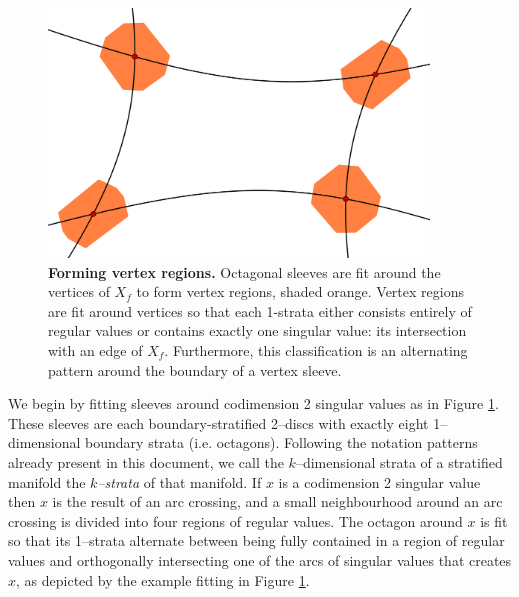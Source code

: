 \begin{figure}[h!]
	\centering
	\includegraphics[width=0.9\textwidth]{figures/vertex-sleeve.png}
	\caption{
		\textbf{Forming vertex regions.}
		Octagonal sleeves are fit around the vertices of $X_f$ to form vertex regions, shaded orange.
		Vertex regions are fit around vertices so that each 1-strata either consists entirely of regular values or contains exactly one singular value: its intersection with an edge of $X_f$.
		Furthermore, this classification is an alternating pattern around the boundary of a vertex sleeve.
	}
	\label{fig:vertex-sleeve}
\end{figure}



We begin by fitting sleeves around codimension 2 singular values as in Figure \ref{fig:vertex-sleeve}.
These sleeves are each boundary-stratified 2--discs with exactly eight 1--dimensional boundary strata (i.e. octagons).
Following the notation patterns already present in this document, we call the $k$--dimensional strata of a stratified manifold the \emph{$k$--strata} of that manifold.
If $x$ is a codimension 2 singular value then $x$ is the result of an arc crossing, and a small neighbourhood around an arc crossing is divided into four regions of regular values.
The octagon around $x$ is fit so that its 1--strata alternate between being fully contained in a region of regular values and orthogonally intersecting one of the arcs of singular values that creates $x$, as depicted by the example fitting in Figure \ref{fig:vertex-sleeve}.

